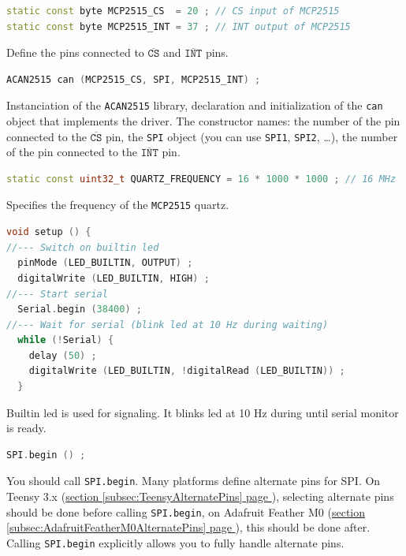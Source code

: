 \documentclass[10pt, a4paper, obeyspaces, openany]{extarticle}
\newcommand\refSubsectionPage[1]{\hyperref[subsec:#1]{section \ref*{subsec:#1} page \pageref{subsec:#1}}}
\begin{document}
{ \small\begin{lstlisting}[language=c++]
static const byte MCP2515_CS  = 20 ; // CS input of MCP2515 
static const byte MCP2515_INT = 37 ; // INT output of MCP2515
\end{lstlisting}}
Define the pins connected to $\overline{\texttt{CS}}$ and $\overline{\texttt{INT}}$ pins.




{ \small\begin{lstlisting}[language=c++]
ACAN2515 can (MCP2515_CS, SPI, MCP2515_INT) ;
\end{lstlisting}}
Instanciation of the \texttt{ACAN2515} library, declaration and initialization of the \texttt{can} object that implements the driver. The constructor names: the number of the pin connected to the $\overline{\texttt{CS}}$ pin, the \texttt{SPI} object (you can use \texttt{SPI1}, \texttt{SPI2}, …), the number of the pin connected to the $\overline{\texttt{INT}}$ pin.

%




{ \small\begin{lstlisting}[language=c++]
static const uint32_t QUARTZ_FREQUENCY = 16 * 1000 * 1000 ; // 16 MHz
\end{lstlisting}}

Specifies the frequency of the \texttt{MCP2515} quartz.








{ \small\begin{lstlisting}[language=c++]
void setup () {
//--- Switch on builtin led
  pinMode (LED_BUILTIN, OUTPUT) ;
  digitalWrite (LED_BUILTIN, HIGH) ;
//--- Start serial
  Serial.begin (38400) ;
//--- Wait for serial (blink led at 10 Hz during waiting)
  while (!Serial) {
    delay (50) ;
    digitalWrite (LED_BUILTIN, !digitalRead (LED_BUILTIN)) ;
  }
\end{lstlisting}}
Builtin led is used for signaling. It blinks led at 10 Hz during until serial monitor is ready.



{ \small\begin{lstlisting}[language=c++]
  SPI.begin () ;
\end{lstlisting}}
You should call \texttt{SPI.begin}. Many platforms define alternate pins for SPI. On Teensy 3.x (\refSubsectionPage{TeensyAlternatePins}), selecting alternate pins should be done before calling \texttt{SPI.begin}, on Adafruit Feather M0 (\refSubsectionPage{AdafruitFeatherM0AlternatePins}), this should be done after. Calling \texttt{SPI.begin} explicitly allows you to fully handle alternate pins.
\end{document}
